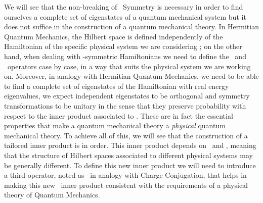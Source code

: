         We will see that the non-breaking of \PT\ Symmetry is necessary in order to find ourselves a complete set of eigenstates of a quantum mechanical system but it does not suffice in the construction of a quantum mechanical theory. In Hermitian Quantum Mechanics, the Hilbert space is defined independently of the Hamiltonian of the specific physical system we are considering \cite{bender2024}; on the other hand, when dealing with \PT-symmetric Hamiltonians we need to define the \hP\ and \hT\ operators case by case, in a way that suits the physical system we are working on. Moreover, in analogy with Hermitian Quantum Mechanics, we need to be able to find a complete set of eigenstates of the Hamiltonian with real energy eigenvalues, we expect independent eigenstates to be orthogonal and symmetry transformations to be unitary in the sense that they preserve probability with respect to the inner product associated to \hPT. These are in fact the essential properties that make a quantum mechanical theory a \emph{physical} quantum mechanical theory. To achieve all of this, we will see that the construction of a tailored inner product is in order. This inner product depends on \hP\ and \hT, meaning that the structure of Hilbert spaces associated to different physical systems may be generally different. To define this new inner product we will need to introduce a third operator, noted as \hC\ in analogy with Charge Conjugation, that helps in making this new \CPT\ inner product consistent with the requirements of a physical theory of Quantum Mechanics.

